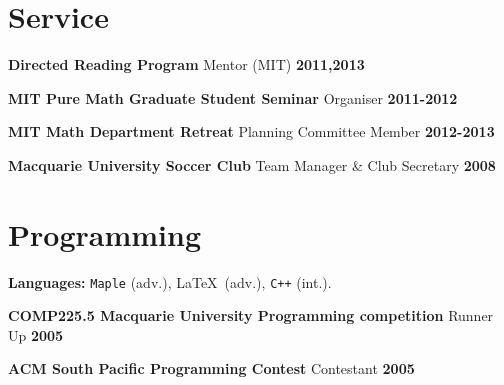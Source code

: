 \documentclass[margin,line]{resume}
\newcommand{\award}[3]{\textbf{#1} #2 \hfill \textbf{#3}
           
\vspace{-2.3mm}}
\begin{document}
\begin{resume}
\vspace{2mm}


   \section{\mysidestyle Service}
\award{Directed Reading Program}{Mentor (MIT)}{2011,2013}
\award{MIT Pure Math Graduate Student Seminar}{Organiser}{2011-2012}
\award{MIT Math Department Retreat}{Planning Committee Member}{2012-2013}
\award{Macquarie University Soccer Club}{Team Manager \& Club Secretary}{2008}


\vspace{2mm}






%   
%    
% 






    \section{\mysidestyle Programming} 
\award{Languages:}{\texttt{Maple} (adv.), \LaTeX\ (adv.), \texttt{C++} (int.).}{}
\award{COMP225.5 Macquarie University Programming competition}{Runner Up}{2005}
\award{ACM South Pacific Programming Contest}{Contestant}{2005}
%





\end{resume}
\end{document}
